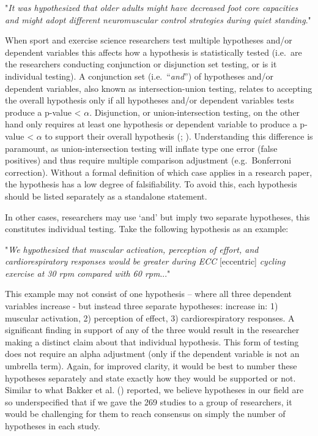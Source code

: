 \documentclass[
]{article}
\begin{document}
\begin{center}

"\textit{It was hypothesized that older adults might have decreased foot core capacities and might adopt different neuromuscular control strategies during quiet standing}."

\end{center}

When sport and exercise science researchers test multiple hypotheses
and/or dependent variables this affects how a hypothesis is
statistically tested (i.e.~are the researchers conducting conjunction or
disjunction set testing, or is it individual testing). A conjunction set
(i.e.~``\emph{and}'') of hypotheses and/or dependent variables, also
known as intersection-union testing, relates to accepting the overall
hypothesis only if all hypotheses and/or dependent variables tests
produce a p-value \textless{} \(\alpha\). Disjunction, or
union-intersection testing, on the other hand only requires at least one
hypothesis or dependent variable to produce a p-value \textless{}
\(\alpha\) to support their overall hypothesis
(;
). Understanding this
difference is paramount, as union-intersection testing will inflate type
one error (false positives) and thus require multiple comparison
adjustment (e.g.~Bonferroni correction). Without a formal definition of
which case applies in a research paper, the hypothesis has a low degree
of falsifiability. To avoid this, each hypothesis should be listed
separately as a standalone statement.

In other cases, researchers may use `and' but imply two separate
hypotheses, this constitutes individual testing. Take the following
hypothesis as an example:

\begin{center}


"\textit{We hypothesized that muscular activation, perception of effort, and cardiorespiratory responses would be greater during ECC} [eccentric] \textit{cycling exercise at 30 rpm compared with 60 rpm}..."

\end{center}

This example may not consist of one hypothesis -- where all three
dependent variables increase - but instead three separate hypotheses:
increase in: 1) muscular activation, 2) perception of effect, 3)
cardiorespiratory responses. A significant finding in support of any of
the three would result in the researcher making a distinct claim about
that individual hypothesis. This form of testing does not require an
alpha adjustment (only if the dependent variable is not an umbrella
term). Again, for improved clarity, it would be best to number these
hypotheses separately and state exactly how they would be supported or
not. Similar to what Bakker et al.
() reported, we believe
hypotheses in our field are so underspecified that if we gave the 269
studies to a group of researchers, it would be challenging for them to
reach consensus on simply the number of hypotheses in each study.
\end{document}
